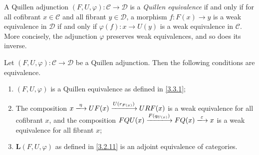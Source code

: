 \begin{definition}\label{3.3.1}
	A Quillen adjunction $(F,U,\varphi): \mathcal{C}  \to \mathcal{D} $ is a \emph{Quillen equivalence} if and only if for all cofibrant $x\in \mathcal{C} $ and all fibrant $y\in \mathcal{D} $, a morphism $f : F(x) \to y$ is a weak equivalence in $\mathcal{D} $ if and only if $\varphi(f): x \to U(y)$ is a weak equivalence in $\mathcal{C} $. More concisely, the adjunction $\varphi$ preserves weak equivalences, and so does its inverse.
\end{definition}
\begin{proposition}\label{3.3.2}
	Let $(F,U,\varphi): \mathcal{C}  \to \mathcal{D} $ be a Quillen adjunction. Then the following conditions are equivalence.
	\begin{enumerate}
		\item $(F,U,\varphi)$ is a Quillen equivalence as defined in \cref{3.3.1};
		\item The composition $x\xlongrightarrow{\eta}UF(x)\xlongrightarrow{U(r_{F(x)})}URF(x)$ is a weak equivalence for all cofibrant $x$, and the composition $FQU(x)\xlongrightarrow{F(q_{U(x)} )}FQ(x)\xlongrightarrow{\varepsilon }x$ is a weak equivalence for all fibrant $x$;
		\item $\mathbf{L} (F,U,\varphi)$ as defined in \cref{3.2.11} is an adjoint equivalence of categories.
	\end{enumerate}
\end{proposition}
